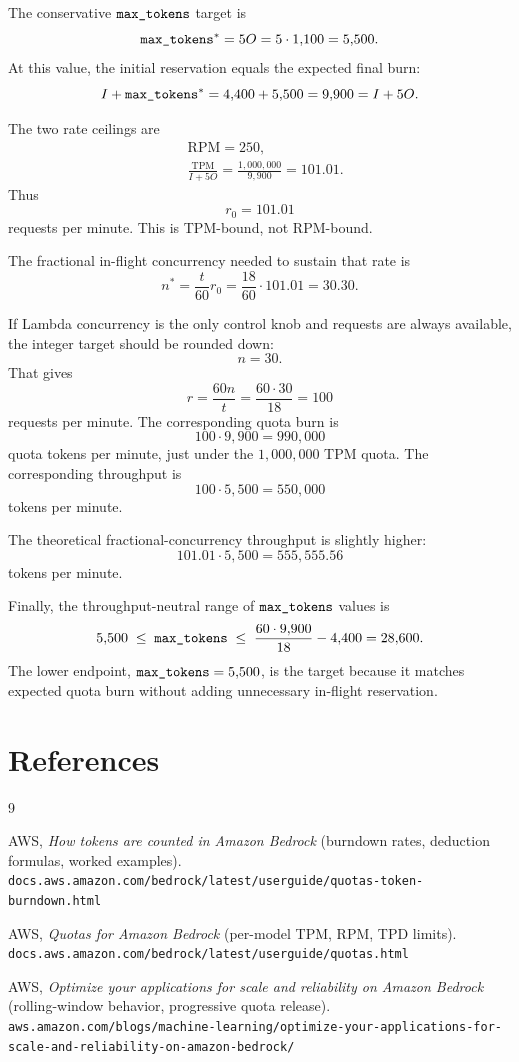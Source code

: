 \documentclass[12pt]{extarticle}
\newcommand{\maxtok}{\text{\texttt{max\_tokens}}}
\newcommand{\inputtokens}{I}
\newcommand{\outputtokens}{O}
\newcommand{\TPM}{\text{TPM}}
\newcommand{\RPM}{\text{RPM}}
\begin{document}
The conservative $\maxtok$ target is
\[
\maxtok^* = 5\outputtokens = 5 \cdot 1{,}100 = 5{,}500.
\]
At this value, the initial reservation equals the expected final burn:
\[
\inputtokens + \maxtok^*
= 4{,}400 + 5{,}500
= 9{,}900
= \inputtokens + 5\outputtokens.
\]

The two rate ceilings are
\[
\begin{aligned}
&\RPM = 250,\\
&\frac{\TPM}{\inputtokens + 5\outputtokens}
=
\frac{1{,}000{,}000}{9{,}900}
=
101.01.
\end{aligned}
\]
Thus
\[
r_0 = 101.01
\]
requests per minute. This is TPM-bound, not RPM-bound.

The fractional in-flight concurrency needed to sustain that rate is
\[
n^*
=
\frac{t}{60}r_0
=
\frac{18}{60} \cdot 101.01
=
30.30.
\]

If Lambda concurrency is the only control knob and requests are always available, the integer target should be rounded down:
\[
n = 30.
\]
That gives
\[
r = \frac{60n}{t}
  = \frac{60 \cdot 30}{18}
  = 100
\]
requests per minute. The corresponding quota burn is
\[
100 \cdot 9{,}900 = 990{,}000
\]
quota tokens per minute, just under the $1{,}000{,}000$ TPM quota. The corresponding throughput is
\[
100 \cdot 5{,}500
= 550{,}000
\]
tokens per minute.

The theoretical fractional-concurrency throughput is slightly higher:
\[
101.01 \cdot 5{,}500
=
555{,}555.56
\]
tokens per minute.

Finally, the throughput-neutral range of $\maxtok$ values is
\[
5{,}500
\;\leq\;
\maxtok
\;\leq\;
\frac{60 \cdot 9{,}900}{18} - 4{,}400
=
28{,}600.
\]
The lower endpoint, $\maxtok = 5{,}500$, is the target because it matches expected quota burn without adding unnecessary in-flight reservation.

\section{References}

\begingroup
\setlength{\parskip}{0pt}
\begin{thebibliography}{9}

AWS, \emph{How tokens are counted in Amazon Bedrock} (burndown rates,
deduction formulas, worked examples).\\
\texttt{\small docs.aws.amazon.com/bedrock/latest/userguide/quotas-token-burndown.html}

AWS, \emph{Quotas for Amazon Bedrock} (per-model TPM, RPM, TPD limits).\\
\texttt{\small docs.aws.amazon.com/bedrock/latest/userguide/quotas.html}

AWS, \emph{Optimize your applications for scale and reliability on Amazon
Bedrock} (rolling-window behavior, progressive quota release).\\
\texttt{\small aws.amazon.com/blogs/machine-learning/\discretionary{}{}{}optimize-your-applications-for-scale-and-reliability-on-amazon-bedrock/}

\end{thebibliography}
\endgroup
\end{document}
